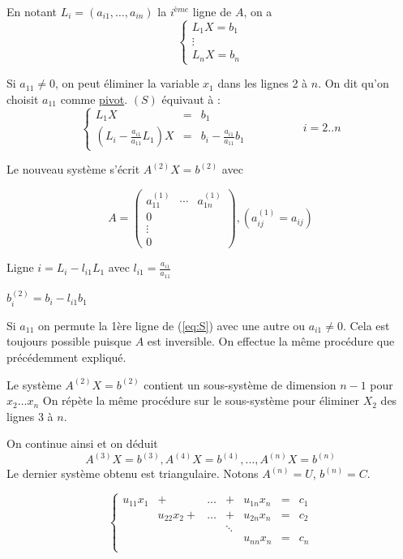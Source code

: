 \documentclass[a4paper,11pt]{article}
\newcommand{\reff}[1]{(\ref{#1})}
\theoremstyle{plain} %
\begin{document}
En notant $L_i = (a_{i1}, \dots, a_{in})$ la $i^{ème}$ ligne de $A$, on a
\begin{equation}
    \left\lbrace
    \begin{array}{ccc}
        L_1 X = b_1 \\
        \vdots \\
        L_n X = b_n
    \end{array}\right.
    \tag{S}
    \label{eq:S}
\end{equation}


Si $a_{11} \neq 0$, on peut éliminer la variable $x_1$ dans les lignes 2 à $n$. On dit qu'on choisit $a_{11}$ comme \underline{pivot}.
$(S)$ équivaut à :
\[
    \left\lbrace
    \begin{array}{ccc}
        L_{1}X & = & b_1 \\
        (L_i - \frac{a_{i1}}{a_{11}}L_1) X & = & b_i - \frac{a_{i1}}{a_{11}}b_1 
    \end{array}\right.
    \hspace{2cm} i = 2..n
\]

Le nouveau système s'écrit $A^{(2)}X =b^{(2)}$ avec

\[
    A = 
    \begin{pmatrix}
        a_{11}^{(1)} & \cdots & a_{1n}^{(1)} \\
        0 \\
        \vdots \\
        0
    \end{pmatrix} 
    ,
    (a_{ij}^{(1)} = a_{ij})
\]

Ligne $i = L_i - l_{i1}L_1$ avec $l_{i1} = \frac{a_{i1}}{a_{11}}$

$b_i^{(2)} =  b_i - l_{i1}b_1$

Si $a_{11}$ on permute la 1ère ligne de \reff{eq:S} avec une autre ou $a_{i1} \neq 0$. Cela est toujours possible puisque $A$ est inversible.
On effectue la même procédure que précédemment expliqué.

Le système $A^{(2)} X = b^{(2)}$ contient un sous-système de dimension $n-1$ pour $x_2\dots x_n$
On répète la même procédure sur le sous-système pour éliminer $X_2$ des lignes 3 à $n$.

On continue ainsi et on déduit
\[
    A^{(3)}X = b^{(3)}, A^{(4)}X = b^{(4)}, \dots, A^{(n)}X=b^{(n)}
\]
Le dernier système obtenu est triangulaire. Notons $A^{(n)}=U$, $b^{(n)}=C$.

\begin{equation}
    \left\lbrace
    \begin{array}{ccccccc}
        u_{11}x_1 & + & \dots & + & u_{1n}x_n & = & c_1 \\
                  & u_{22}x_2 + & \dots & + & u_{2n}x_n & = & c_2 \\
        & & & \ddots \\
        & & & & u_{nn}x_n & = & c_n \\
    \end{array}\right.
    \tag{S'}
    \label{eq:S2}
\end{equation}
\end{document}
